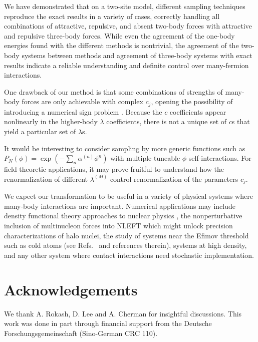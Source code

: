 \documentclass[aps,prl,twocolumn,showpacs,superscriptaddress,groupedaddress, final, nofootinbib]{revtex4}  %
\begin{document}
We have demonstrated that on a two-site model, different sampling techniques reproduce the exact results in a variety of cases, correctly handling all combinations of attractive, repulsive, and absent two-body forces with attractive and repulsive three-body forces.  While even the agreement of the one-body energies found with the different methods is nontrivial, the agreement of the two-body systems between methods and agreement of three-body systems with exact results indicate a reliable understanding and definite control over many-fermion interactions.

One drawback of our method is that some combinations of strengths of many-body forces are only achievable with complex $c_j$, opening the possibility of introducing a numerical sign problem \cite{Chen:2004rq}.  Because the $c$ coefficients appear nonlinearly in the higher-body $\lambda$ coefficients, there is not a unique set of $c$s that yield a particular set of $\lambda$s.

It would be interesting to consider sampling by more generic functions such as $P_N(\phi)=\exp(-\sum_n \alpha^{(n)}\phi^{n})$ with multiple tuneable $\phi$ self-interactions.  For field-theoretic applications, it may prove fruitful to understand how the renormalization of different $\lambda^{(M)}$ control renormalization of the parameters $c_j$.

We expect our transformation to be useful in a variety of physical systems where many-body interactions are important.  Numerical applications may include density functional theory approaches to nuclear physics \cite{Drut:2009ce}, the nonperturbative inclusion of multinucleon forces into NLEFT which might unlock precision characterizations of halo nuclei, the study of systems near the Efimov threshold such as cold atoms (see Refs.~\cite{Braaten:2006vd,Naidon:2016dpf} and references therein), systems at high density, and any other system where contact interactions need stochastic implementation.

\appendix
\section{Acknowledgements}
We thank A. Rokash, D. Lee and A. Cherman for insightful discussions.  This work was done in part through financial support from the Deutsche Forschungsgemeinschaft (Sino-German CRC 110).


\end{document}
